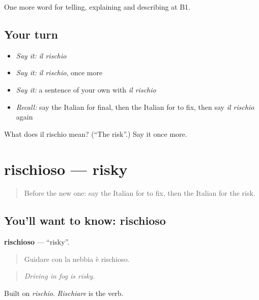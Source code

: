 \begin{grammarlens}[title={What you've built}]
One more word for telling, explaining and describing at B1.
\end{grammarlens}

\subsection*{Your turn}
\begin{itemize}
\raggedright
  \item \emph{Say it:} \emph{il rischio}
  \item \emph{Say it:} \emph{il rischio}, once more
  \item \emph{Say it:} a sentence of your own with \emph{il rischio}
  \item \emph{Recall:} say the Italian for final, then the Italian for to fix, then say \emph{il rischio} again
\end{itemize}

\begin{tcolorbox}[breakable,colback=teal!4,colframe=teal!35!black,title={Before you move on}]
What does il rischio mean? (\textquotedblleft{}The risk\textquotedblright{}.) Say it once more.
\end{tcolorbox}
\section[rischioso]{rischioso — risky}

\label{lesson:IT-C376-rischioso}



\begin{quote}
Before the new one: say the Italian for to fix, then the Italian for the risk.
\end{quote}

\subsection*{You'll want to know: rischioso}
\textbf{rischioso} — \textquotedblleft{}risky\textquotedblright{}.

\begin{quote}
Guidare con la nebbia è rischioso.
\end{quote}

\begin{quote}
\emph{Driving in fog is risky.}
\end{quote}

Built on \emph{rischio}. \emph{Rischiare} is the verb.


